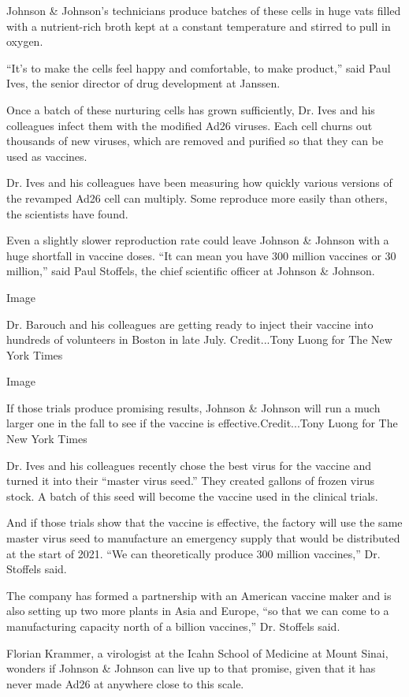 Johnson \& Johnson's technicians produce batches of these cells in huge
vats filled with a nutrient-rich broth kept at a constant temperature
and stirred to pull in oxygen.

``It's to make the cells feel happy and comfortable, to make product,''
said Paul Ives, the senior director of drug development at Janssen.

Once a batch of these nurturing cells has grown sufficiently, Dr. Ives
and his colleagues infect them with the modified Ad26 viruses. Each cell
churns out thousands of new viruses, which are removed and purified so
that they can be used as vaccines.

Dr. Ives and his colleagues have been measuring how quickly various
versions of the revamped Ad26 cell can multiply. Some reproduce more
easily than others, the scientists have found.

Even a slightly slower reproduction rate could leave Johnson \& Johnson
with a huge shortfall in vaccine doses. ``It can mean you have 300
million vaccines or 30 million,'' said Paul Stoffels, the chief
scientific officer at Johnson \& Johnson.

Image

Dr. Barouch and his colleagues are getting ready to inject their vaccine
into hundreds of volunteers in Boston in late July. Credit...Tony Luong
for The New York Times

Image

If those trials produce promising results, Johnson \& Johnson will run a
much larger one in the fall to see if the vaccine is
effective.Credit...Tony Luong for The New York Times

Dr. Ives and his colleagues recently chose the best virus for the
vaccine and turned it into their ``master virus seed.'' They created
gallons of frozen virus stock. A batch of this seed will become the
vaccine used in the clinical trials.

And if those trials show that the vaccine is effective, the factory will
use the same master virus seed to manufacture an emergency supply that
would be distributed at the start of 2021. ``We can theoretically
produce 300 million vaccines,'' Dr. Stoffels said.

The company has formed a partnership with an American vaccine maker and
is also setting up two more plants in Asia and Europe, ``so that we can
come to a manufacturing capacity north of a billion vaccines,'' Dr.
Stoffels said.

Florian Krammer, a virologist at the Icahn School of Medicine at Mount
Sinai, wonders if Johnson \& Johnson can live up to that promise, given
that it has never made Ad26 at anywhere close to this scale.

